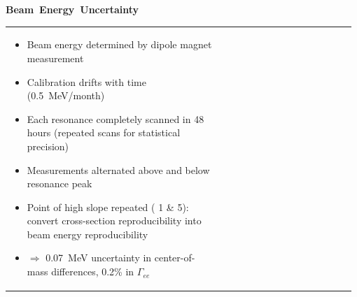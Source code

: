 \documentclass[landscape]{article}
\newenvironment{slide}[1][ ]{\mbox{\bf #1 } \vfill}{\vfill \mbox{ } \hfill \Large \arabic{page} \pagebreak}
\newcommand{\gee}{{\boldmath $\Gamma_{ee}$}}
\begin{document}
\begin{slide}[Beam Energy Uncertainty]

\begin{tabular}{p{0.6\linewidth} p{0.38\linewidth}}
  \begin{minipage}{\linewidth}
    \begin{minipage}{0.9\linewidth}
      \begin{itemize}\setlength{\itemsep}{0.75 cm}

	\item Beam energy determined by dipole magnet measurement

	\item Calibration drifts with time (0.5~MeV/month)

	\item Each resonance completely scanned in 48 hours (repeated
	scans for statistical precision)

        \item Measurements alternated above and below resonance peak

        \item Point of high slope repeated ({\color{red} 1 \& 5}):
        convert cross-section reproducibility into beam energy reproducibility

	\item $\Rightarrow$ 0.07~MeV uncertainty in center-of-mass differences, 0.2\% in \gee

	\end{itemize}
    \end{minipage}


\end{minipage}
\end{tabular}
\end{slide}
\end{document}
